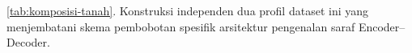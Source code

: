 \documentclass[12pt, a4paper]{article}
\begin{document}
\ref{tab:komposisi-tanah}. Konstruksi independen dua profil dataset ini yang menjembatani skema pembobotan spesifik arsitektur pengenalan saraf Encoder--Decoder.
\end{document}
